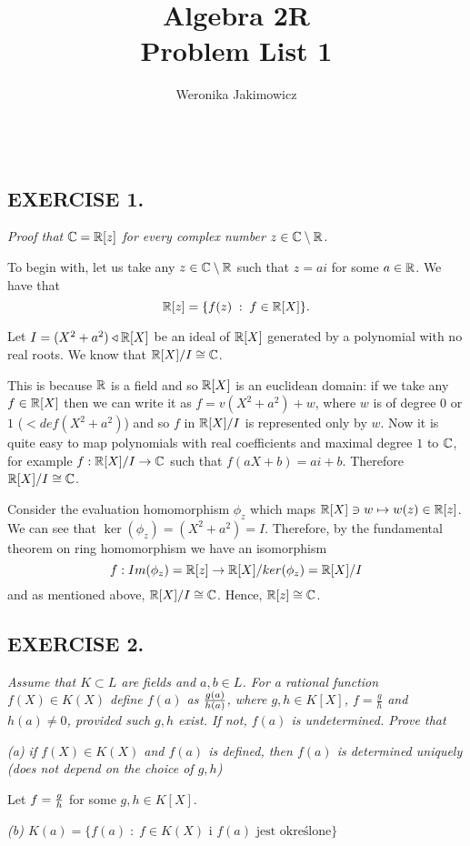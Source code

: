 \documentclass{article}
\title{\large Algebra 2R\smallskip\\ \textbf{Problem List 1}}
\author{\normalsize Weronika Jakimowicz}
\date{~~~}
\begin{document}
\maketitle
\thispagestyle{empty}

\subsection*{EXERCISE 1.}
\emph{Proof that $\mathbb{C}=\mathbb{R}[z]$ for every complex number $z\in \mathbb{C}\setminus\mathbb{R}$.}
\smallskip

To begin with, let us take any $z\in\mathbb{C}\setminus\mathbb{R}$ such that $z=ai$ for some $a\in\mathbb{R}$. We have that
$$\mathbb{R}[z]=\{f(z)\;:\;f\in\mathbb{R}[X]\}.$$

Let $I=(X^2+a^2)\triangleleft\mathbb{R}[X]$ be an ideal of $\mathbb{R}[X]$ generated by a polynomial with no real roots. We know that $\mathbb{R}[X]/I\cong \mathbb{C}$. 

This is because $\mathbb{R}$ is a field and so $\mathbb{R}[X]$ is an euclidean domain: if we take any $f\in\mathbb{R}[X]$ then we can write it as $f=v(X^2+a^2)+w$, where $w$ is of degree $0$ or $1$ ($<def(X^2+a^2)$) and so $f$ in $\mathbb{R}[X]/I$ is represented only by $w$. Now it is quite easy to map polynomials with real coefficients and maximal degree $1$ to $\mathbb{C}$, for example $f:\mathbb{R}[X]/I\to\mathbb{C}$ such that $f(aX+b)=ai+b$. Therefore $\mathbb{R}[X]/I\cong \mathbb{C}$.

Consider the evaluation homomorphism $\phi_z$ which maps $\mathbb{R}[X]\ni w\mapsto w(z)\in\mathbb{R}[z]$. We can see that $\ker(\phi_z)=(X^2+a^2)=I$. Therefore, by the fundamental theorem on ring homomorphism we have an isomorphism
$$f:Im(\phi_z)=\mathbb{R}[z]\to \mathbb{R}[X]/ker(\phi_z)=\mathbb{R}[X]/I$$
and as mentioned above, $\mathbb{R}[X]/I\cong\mathbb{C}$. Hence, $\mathbb{R}[z]\cong\mathbb{C}$.

\proofend

\subsection*{EXERCISE 2.}
\emph{Assume that $K\subset L$ are fields and $a,b\in L$. For a rational function $f(X)\in K(X)$ define $f(a)$ as ${g(a)\over h(a)}$, where $g,h\in K[X]$, $f=\frac gh$ and $h(a)\neq 0$, provided such $g,h$ exist. If not, $f(a)$ is undetermined. Prove that}
\smallskip

\emph{(a) if $f(X)\in K(X)$ and $f(a)$ is defined, then $f(a)$ is determined uniquely (does not depend on the choice of $g, h$)}
\smallskip

Let $f={g\over h}$ for some $g,h\in K[X]$. 

\emph{(b) $K(a)=\{f(a)\;:\;f\in K(X)\text{ i }f(a)\text{ jest określone}\}$}
\end{document}
